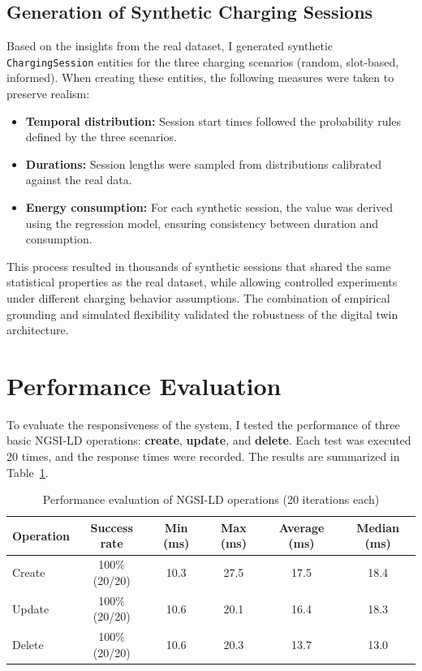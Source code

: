 \subsection*{Generation of Synthetic Charging Sessions}
Based on the insights from the real dataset, I generated synthetic \texttt{ChargingSession} entities for the three charging scenarios (random, slot-based, informed).  
When creating these entities, the following measures were taken to preserve realism:

\begin{itemize}
    \item \textbf{Temporal distribution:} Session start times followed the probability rules defined by the three scenarios.
    \item \textbf{Durations:} Session lengths were sampled from distributions calibrated against the real data.
    \item \textbf{Energy consumption:} For each synthetic session, the value was derived using the regression model, ensuring consistency between duration and consumption.
\end{itemize}

This process resulted in thousands of synthetic sessions that shared the same statistical properties as the real dataset, while allowing controlled experiments under different charging behavior assumptions.  
The combination of empirical grounding and simulated flexibility validated the robustness of the digital twin architecture.

\section{Performance Evaluation}

To evaluate the responsiveness of the system, I tested the performance of three basic NGSI-LD operations: \textbf{create}, \textbf{update}, and \textbf{delete}.  
Each test was executed 20 times, and the response times were recorded.  
The results are summarized in Table~\ref{tab:performance}.

\begin{table}[ht!]
    \centering
    \caption{Performance evaluation of NGSI-LD operations (20 iterations each)}
    \label{tab:performance}
    \begin{tabular}{|l|c|c|c|c|c|}
        \hline
        \textbf{Operation} & \textbf{Success rate} & \textbf{Min (ms)} & \textbf{Max (ms)} & \textbf{Average (ms)} & \textbf{Median (ms)} \\
        \hline
        Create  & 100\% (20/20) & 10.3 & 27.5 & 17.5 & 18.4 \\
        \hline
        Update  & 100\% (20/20) & 10.6 & 20.1 & 16.4 & 18.3 \\
        \hline
        Delete  & 100\% (20/20) & 10.6 & 20.3 & 13.7 & 13.0 \\
        \hline
    \end{tabular}
\end{table}

